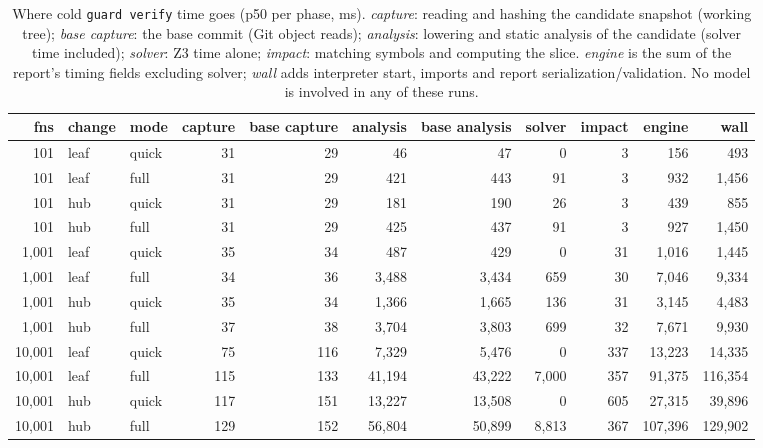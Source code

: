 \begin{table}[h!]
\centering
\small

\caption{Where cold \texttt{guard verify} time goes (p50 per phase, ms). \emph{capture}: reading and hashing the candidate snapshot (working tree); \emph{base capture}: the base commit (Git object reads); \emph{analysis}: lowering and static analysis of the candidate (solver time included); \emph{solver}: Z3 time alone; \emph{impact}: matching symbols and computing the slice. \emph{engine} is the sum of the report's timing fields excluding solver; \emph{wall} adds interpreter start, imports and report serialization/validation. No model is involved in any of these runs.}
\label{tab:phases}
\begin{tabular}{rllrrrrrrrr}
\toprule
fns & change & mode & capture & base capture & analysis & base analysis & solver & impact & engine & wall \\
\midrule
101 & leaf & quick & 31 & 29 & 46 & 47 & 0 & 3 & 156 & 493 \\
101 & leaf & full & 31 & 29 & 421 & 443 & 91 & 3 & 932 & 1{,}456 \\
101 & hub & quick & 31 & 29 & 181 & 190 & 26 & 3 & 439 & 855 \\
101 & hub & full & 31 & 29 & 425 & 437 & 91 & 3 & 927 & 1{,}450 \\
1{,}001 & leaf & quick & 35 & 34 & 487 & 429 & 0 & 31 & 1{,}016 & 1{,}445 \\
1{,}001 & leaf & full & 34 & 36 & 3{,}488 & 3{,}434 & 659 & 30 & 7{,}046 & 9{,}334 \\
1{,}001 & hub & quick & 35 & 34 & 1{,}366 & 1{,}665 & 136 & 31 & 3{,}145 & 4{,}483 \\
1{,}001 & hub & full & 37 & 38 & 3{,}704 & 3{,}803 & 699 & 32 & 7{,}671 & 9{,}930 \\
10{,}001 & leaf & quick & 75 & 116 & 7{,}329 & 5{,}476 & 0 & 337 & 13{,}223 & 14{,}335 \\
10{,}001 & leaf & full & 115 & 133 & 41{,}194 & 43{,}222 & 7{,}000 & 357 & 91{,}375 & 116{,}354 \\
10{,}001 & hub & quick & 117 & 151 & 13{,}227 & 13{,}508 & 0 & 605 & 27{,}315 & 39{,}896 \\
10{,}001 & hub & full & 129 & 152 & 56{,}804 & 50{,}899 & 8{,}813 & 367 & 107{,}396 & 129{,}902 \\
\bottomrule
\end{tabular}
\end{table}
